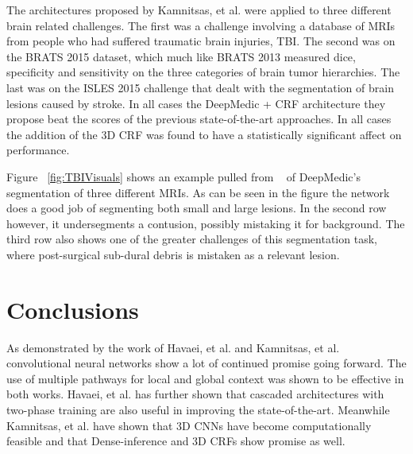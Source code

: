 \documentclass{sig-alternate}
\begin{document}

The architectures proposed by Kamnitsas, et al. were applied to three different brain related challenges. The first was a challenge involving a database of MRIs from people who had suffered traumatic brain injuries, TBI. The second was on the BRATS 2015 dataset, which much like BRATS 2013 measured dice, specificity and sensitivity on the three categories of brain tumor hierarchies. The last was on the ISLES 2015 challenge that dealt with the segmentation of brain lesions caused by stroke. In all cases the DeepMedic + CRF architecture they propose beat the scores of the previous state-of-the-art approaches. In all cases the addition of the 3D CRF was found to have a statistically significant affect on performance.


\begin{figure*}
\centering
{}
\caption{Three examples from the TBI dataset. The first two columns show the original MRIs with the third column showing the images segmented manually and the last two columns showing the segmentation performed by DeepMedic and DeepMedic with the CRF. Kamnitsas, et al. ~\cite{Kamnitsas:2017}}
\label{fig:TBIVisuals}
\end{figure*}

Figure ~\ref{fig:TBIVisuals} shows an example pulled from ~\cite{Kamnitsas:2017} of DeepMedic's segmentation of three different MRIs. As can be seen in the figure the network does a good job of segmenting both small and large lesions. In the second row however, it undersegments a contusion, possibly mistaking it for background. The third row also shows one of the greater challenges of this segmentation task, where post-surgical sub-dural debris is mistaken as a relevant lesion.~\cite{Kamnitsas:2017}

\section{Conclusions}
\label{sec:conclusions}

As demonstrated by the work of Havaei, et al. and Kamnitsas, et al. convolutional neural networks show a lot of continued promise going forward. The use of multiple pathways for local and global context was shown to be effective in both works. Havaei, et al. has further shown that cascaded architectures with two-phase training are also useful in improving the state-of-the-art. Meanwhile Kamnitsas, et al. have shown that 3D CNNs have become computationally feasible and that Dense-inference and 3D CRFs show promise as well.
\end{document}
